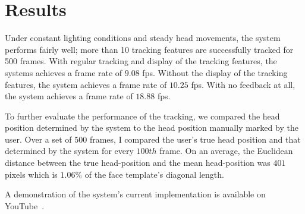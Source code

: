 \section{Results}
\label{sec:results}

Under constant lighting conditions and steady head movements, the system performs fairly well; more than 10 tracking features are successfully tracked for 500 frames. With regular tracking and display of the tracking features, the systems achieves a frame rate of $9.08$ fps. Without the display of the tracking features, the system achieves a frame rate of $10.25$ fps. With no feedback at all, the system achieves a frame rate of $18.88$ fps.

To further evaluate the performance of the tracking, we compared the head position determined by the system to the head position manually marked by the user. Over a set of $500$ frames, I compared the user's true head position and that determined by the system for every $100th$ frame. On an average, the Euclidean distance between the true head-position and the mean head-position was $401$ pixels which is $1.06\%$ of the face template's diagonal length.

A demonstration of the system's current implementation is available on YouTube~\cite{demo}.

